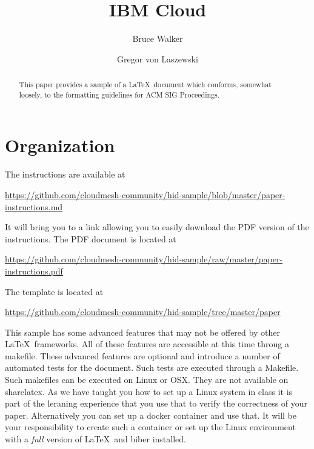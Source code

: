 
\title{IBM Cloud}


\author{Bruce Walker}

\author{Gregor von Laszewski}


\renewcommand{\shortauthors}{G. v. Laszewski}


\begin{abstract}
This paper provides a sample of a \LaTeX\ document which conforms,
somewhat loosely, to the formatting guidelines for
ACM SIG Proceedings.
\end{abstract}



\maketitle

\section{Organization}

The instructions are available at 

\url{https://github.com/cloudmesh-community/hid-sample/blob/master/paper-instructions.md}

It will bring you to a link allowing you to easily download the PDF
version of the instructions. The PDF document is located at 

\url{https://github.com/cloudmesh-community/hid-sample/raw/master/paper-instructions.pdf}


The template is located at

\url{https://github.com/cloudmesh-community/hid-sample/tree/master/paper}


This sample has some advanced features that may not be offered by
other \LaTeX\ frameworks. All of these features are accessible at this
time throug a makefile. These advanced features are optional and
introduce a number of automated tests for the document. Such tests are
executed through a Makefile. Such makefiles can be executed on Linux
or OSX. They are not available on sharelatex. As we have taught you
how to set up a Linux system in class it is part of the leraning
experience that you use that to verify the correctness of your
paper. Alternatively you can set up a docker container and use
that. It will be your responsibility to create such a container or set
up the Linux environment with a \textit{full} version of \LaTeX\ and biber
installed.

